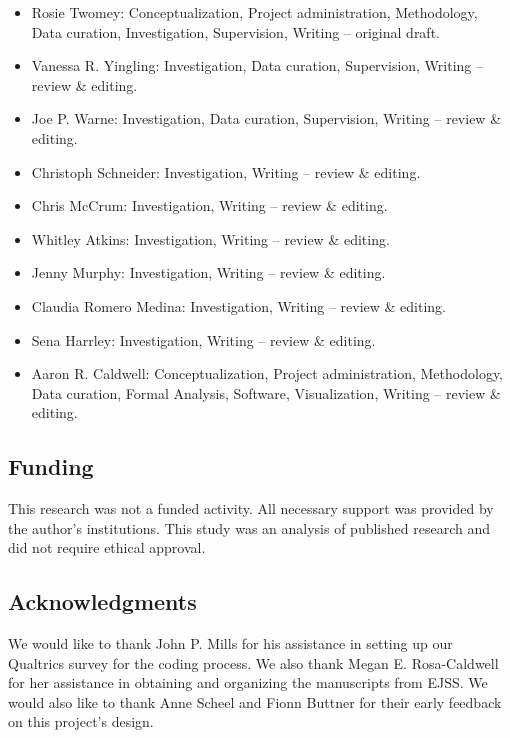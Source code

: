 \documentclass[]{cik}%
\begin{document}
\begin{itemize}
\tightlist
\item
  Rosie Twomey: Conceptualization, Project administration, Methodology,
  Data curation, Investigation, Supervision, Writing -- original draft.
\item
  Vanessa R. Yingling: Investigation, Data curation, Supervision,
  Writing -- review \& editing.
\item
  Joe P. Warne: Investigation, Data curation, Supervision, Writing --
  review \& editing.
\item
  Christoph Schneider: Investigation, Writing -- review \& editing.
\item
  Chris McCrum: Investigation, Writing -- review \& editing.
\item
  Whitley Atkins: Investigation, Writing -- review \& editing.
\item
  Jenny Murphy: Investigation, Writing -- review \& editing.
\item
  Claudia Romero Medina: Investigation, Writing -- review \& editing.
\item
  Sena Harrley: Investigation, Writing -- review \& editing.
\item
  Aaron R. Caldwell: Conceptualization, Project administration,
  Methodology, Data curation, Formal Analysis, Software, Visualization,
  Writing -- review \& editing.
\end{itemize}

\hypertarget{funding}{%
\subsection{Funding}\label{funding}}

This research was not a funded activity. All necessary support was
provided by the author's institutions. This study was an analysis of
published research and did not require ethical approval.

\hypertarget{acknowledgments}{%
\subsection{Acknowledgments}\label{acknowledgments}}

We would like to thank John P. Mills for his assistance in setting up
our Qualtrics survey for the coding process. We also thank Megan E.
Rosa-Caldwell for her assistance in obtaining and organizing the
manuscripts from EJSS. We would also like to thank Anne Scheel and Fionn
Buttner for their early feedback on this project's design.
\end{document}
